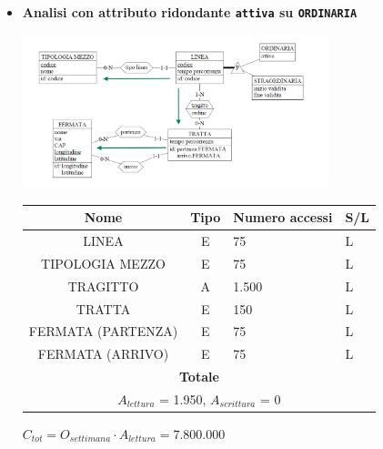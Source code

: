 \documentclass[12pt,a4paper]{report}
\begin{document}
\begin{enumerate}[label=\textbf{\arabic*)}]
    \begin{itemize}
    \item \textbf{Analisi con attributo ridondante \texttt{attiva} su \texttt{ORDINARIA}}
    \begin{center}
    \includegraphics[width=0.7\textwidth]{VisualLineeRid}
    \end{center}
    \begin{table}[H]
    \centering
    \begin{tabular}{|c|c|l|l|}
    \hline
    \textbf{Nome} & \textbf{Tipo} & \textbf{Numero accessi} & \textbf{S/L} \\
    \hline
    LINEA & E & 75 & L \\
    \hline
    TIPOLOGIA MEZZO & E & 75 & L \\
    \hline
    TRAGITTO & A & 1.500 & L \\
    \hline
    TRATTA & E & 150 & L \\
    \hline
    FERMATA (PARTENZA) & E & 75 & L \\
    \hline
    FERMATA (ARRIVO) & E & 75 & L \\
    \hline
    \multicolumn{4}{c}{\textbf{Totale}} \\
    \multicolumn{4}{c}{${A_{lettura}}$ = 1.950, ${A_{scrittura}}$ = 0} \\
    \hline
    \end{tabular}
    \end{table}
    \begin{center}
    ${C_{tot} = {O_{settimana}}\cdot{A_{lettura}}= 7.800.000}$
    \end{center}


\end{itemize}
\end{enumerate}
\end{document}
